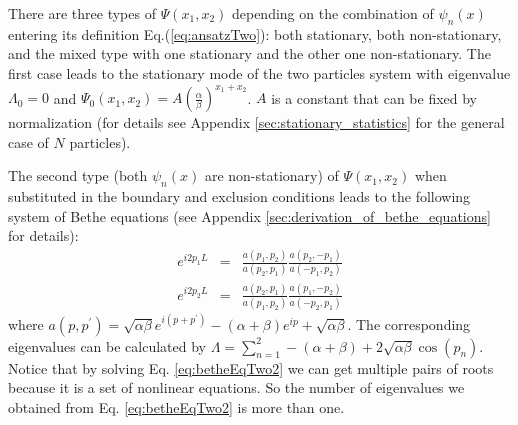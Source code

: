 \documentclass[aps,showpacs,twocolumn,floatfix,prx,superscriptaddress]{revtex4-1}
\begin{document}
There are three types of $\Psi(x_1, x_2)$ depending on the combination of $\psi_n(x)$ entering its definition Eq.(\ref{eq:ansatzTwo}): both stationary, both non-stationary, and the mixed type with one stationary and the other one non-stationary. The first case leads to the stationary mode of the two particles system with eigenvalue $\Lambda_0 = 0$ and $\Psi_0(x_1, x_2) = A \left(\frac{\alpha}{\beta}\right)^{x_1+x_2}$. $A$ is a constant that can be fixed by normalization (for details see Appendix \ref{sec:stationary_statistics} for the general case of $N$ particles).

The second type (both $\psi_n(x)$ are non-stationary) of $\Psi(x_1, x_2)$ when substituted in the boundary and exclusion conditions leads to the following system of Bethe equations \cite{Derrida1998} (see Appendix \ref{sec:derivation_of_bethe_equations} for details):
\begin{subequations}
    \label{eq:betheEqTwo2}
    \begin{eqnarray}
        e^{i2p_1L} & = & \frac{a(p_1, p_2)}{a(p_2, p_1)} 
        \frac{a(p_2, -p_1)}{a(-p_1, p_2)}\\
        e^{i2p_2L} & = & \frac{a(p_2, p_1)}{a(p_1, p_2)} 
        \frac{a(p_1, -p_2)}{a(-p_2, p_1)}
    \end{eqnarray}
\end{subequations}
where $a(p, p^\prime) = \sqrt{\alpha\beta}e^{i(p+p^\prime)}-(\alpha+\beta)e^{ip}+\sqrt{\alpha\beta}$. 
The corresponding eigenvalues can be calculated by $\Lambda = \sum_{n=1}^2 -(\alpha+\beta)+2\sqrt{\alpha\beta}\cos(p_n)$. Notice that by solving Eq. \eqref{eq:betheEqTwo2} we can get multiple pairs of roots because it is a set of nonlinear equations. 
So the number of eigenvalues we obtained from Eq. \eqref{eq:betheEqTwo2} is more than one.
\end{document}
